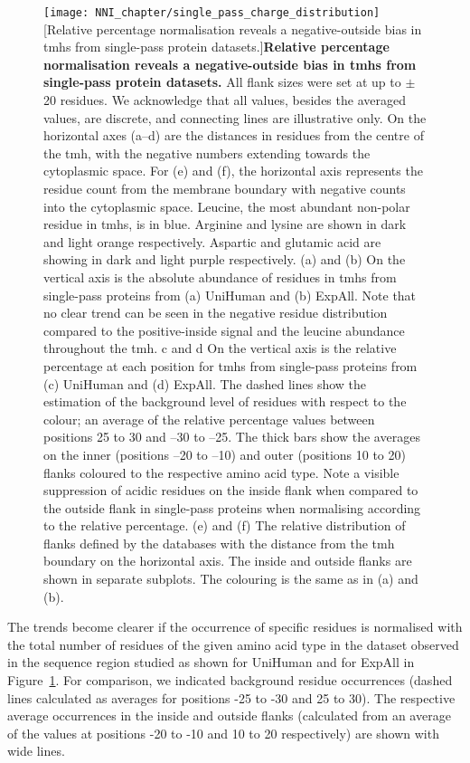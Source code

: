 \begin{figure}[p]
\centering
\texttt{[image: NNI\_chapter/single\_pass\_charge\_distribution]}
[Relative percentage normalisation reveals a negative-outside bias in \gls{tmh}s from single-pass protein datasets.]{\textbf{Relative percentage normalisation reveals a negative-outside bias in \gls{tmh}s from single-pass protein datasets.} All flank sizes were set at up to $\pm$20 residues. We acknowledge that all values, besides the averaged values, are discrete, and connecting lines are illustrative only. On the horizontal axes (a–d) are the distances in residues from the centre of the \gls{tmh}, with the negative numbers extending towards the cytoplasmic space. For (e) and (f), the horizontal axis represents the residue count from the membrane boundary with negative counts into the cytoplasmic space. Leucine, the most abundant non-polar residue in \gls{tmh}s, is in blue. Arginine and lysine are shown in dark and light orange respectively. Aspartic and glutamic acid are showing in dark and light purple respectively. (a) and (b) On the vertical axis is the absolute abundance of residues in \gls{tmh}s from single-pass proteins from (a) UniHuman and (b) ExpAll. Note that no clear trend can be seen in the negative residue distribution compared to the positive-inside signal and the leucine abundance throughout the \gls{tmh}. c and d On the vertical axis is the relative percentage at each position for \gls{tmh}s from single-pass proteins from (c) UniHuman and (d) ExpAll. The dashed lines show the estimation of the background level of residues with respect to the colour; an average of the relative percentage values between positions 25 to 30 and –30 to –25. The thick bars show the averages on the inner (positions –20 to –10) and outer (positions 10 to 20) flanks coloured to the respective amino acid type. Note a visible suppression of acidic residues on the inside flank when compared to the outside flank in single-pass proteins when normalising according to the relative percentage. (e) and (f) The relative distribution of flanks defined by the databases with the distance from the \gls{tmh} boundary on the horizontal axis. The inside and outside flanks are shown in separate subplots. The colouring is the same as in (a) and (b).}


\label{fig:single_pass_charge_distribution}
\end{figure}

The trends become clearer if the occurrence of specific residues is normalised with the total number of residues of the given amino acid type in the dataset observed in the sequence region studied as shown for UniHuman and for ExpAll in Figure~\ref{fig:single_pass_charge_distribution}. For comparison, we indicated background residue occurrences (dashed lines calculated as averages for positions -25 to -30 and 25 to 30). The respective average occurrences in the inside and outside flanks (calculated from an average of the values at positions -20 to -10 and 10 to 20 respectively) are shown with wide lines.

